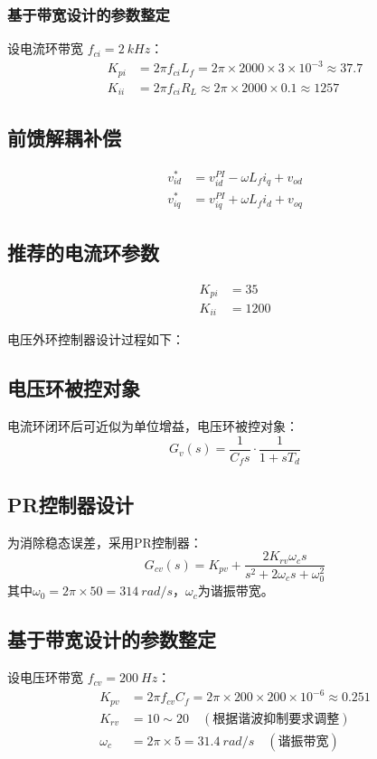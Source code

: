 \documentclass[11pt,a4paper]{article}
\begin{document}
\subsubsection{基于带宽设计的参数整定}
设电流环带宽 $f_{ci} = \SI{2}{kHz}$：
\begin{align}
K_{pi} &= 2\pi f_{ci} L_f = 2\pi\times2000\times3\times10^{-3} \approx 37.7 \\
K_{ii} &= 2\pi f_{ci} R_L \approx 2\pi\times2000\times0.1 \approx 1257
\end{align}

\subsection{前馈解耦补偿}
\begin{align}
v_{id}^* &= v_{id}^{PI} - \omega L_f i_q + v_{od} \\
v_{iq}^* &= v_{iq}^{PI} + \omega L_f i_d + v_{oq}
\end{align}

\subsection{推荐的电流环参数}
\begin{align}
K_{pi} &= 35 \\
K_{ii} &= 1200
\end{align}

电压外环控制器设计过程如下：

\subsection{电压环被控对象}
电流环闭环后可近似为单位增益，电压环被控对象：
\begin{equation}
G_v(s) = \frac{1}{C_f s} \cdot \frac{1}{1 + sT_d}
\end{equation}

\subsection{PR控制器设计}
为消除稳态误差，采用PR控制器：
\begin{equation}
G_{cv}(s) = K_{pv} + \frac{2K_{rv}\omega_c s}{s^2 + 2\omega_c s + \omega_0^2}
\end{equation}
其中$\omega_0 = 2\pi\times50 = \SI{314}{rad/s}$，$\omega_c$为谐振带宽。

\subsection{基于带宽设计的参数整定}
设电压环带宽 $f_{cv} = \SI{200}{Hz}$：
\begin{align}
K_{pv} &= 2\pi f_{cv} C_f = 2\pi\times200\times200\times10^{-6} \approx 0.251 \\
K_{rv} &= 10 \sim 20 \quad (\text{根据谐波抑制要求调整}) \\
\omega_c &= 2\pi\times5 = \SI{31.4}{rad/s} \quad (\text{谐振带宽})
\end{align}
\end{document}
